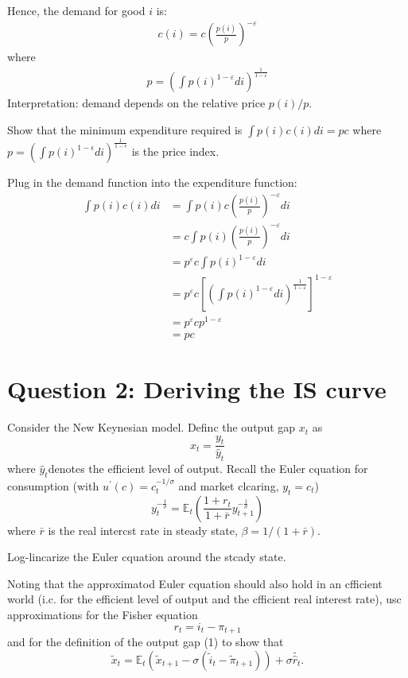 \begin{solution}
    Hence, the demand for good $i$ is:
    \begin{align*}
        c(i) = c \left( \frac{p(i)}{p} \right)^{-\varepsilon}
    \end{align*}
    where
    \begin{align*}
        p = \left( \int p(i)^{1-\varepsilon} di \right)^{\frac{1}{1-\varepsilon}}
    \end{align*}
    Interpretation: demand depends on the relative price $p(i)/p$.
\end{solution}

\begin{problem*}[2]
    Show that the minimum expenditure required is $\int p(i)c(i)di=pc$ where $p=(\int p(i)^{1-\epsilon}di)^{\frac1{1-\epsilon}}$ is the
price index.
\end{problem*}

\begin{solution}
    Plug in the demand function into the expenditure function:
    \begin{align*}
        \int p(i)c(i)di &= \int p(i)c \left( \frac{p(i)}{p} \right)^{-\varepsilon} di \\
        &= c \int p(i) \left( \frac{p(i)}{p} \right)^{-\varepsilon} di \\
        &= p^{\varepsilon} c \int p(i)^{1-\varepsilon} di \\
        &= p^{\varepsilon}c \left[\left( \int p(i)^{1-\varepsilon} di \right)^{\frac{1}{1-\varepsilon}}\right]^{1-\varepsilon} \\
        &= p^{\varepsilon}c p^{1-\varepsilon} \\
        &= pc
    \end{align*}
\end{solution}

\section*{Question 2: Deriving the IS curve}
Consider the New Keynesian model. Definc the output gap $x_t$ as
\[
x_t=\frac{y_t}{\hat{y}_t}
\]
where $\hat{y} _t$denotes the efficient level of output.
Recall the Euler cquation for consumption (with $u^{\prime}(c)=c_{t}^{-1/\sigma}$ 
and market clcaring, $y_t=c_t$)
\[
y_t^{-\frac1\sigma}=\mathbb{E}_t\left(\frac{1+r_t}{1+\bar{r}}y_{t+1}^{-\frac1\sigma}\right)
\]
where $\bar{r}$ is the real intercst rate in steady state, $\beta=1/(1+\bar{r}).$
\begin{problem*}[1]
    Log-lincarize the Euler cquation around the stcady state.
\end{problem*}
\begin{problem*}[2]
    Noting that the approximatod Euler cquation should also hold in an cfficient world
    (i.c. for the efficient level of output and the cfficient real interest rate), 
    usc approximations for the Fisher equation
    \[
    r_t=i_t-\pi_{t+1}
    \]
    and for the definition of the output gap (1) to show that
    \[
    \widetilde{x}_t=\mathbb{E}_t\left(\widetilde{x}_{t+1}-\sigma(\widetilde{i}_t-\widetilde{\pi}_{t+1})\right)+\sigma\widetilde{\hat{r}_t}.
    \]
\end{problem*}

